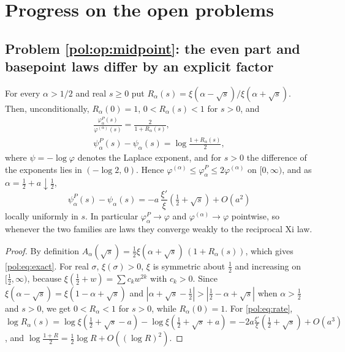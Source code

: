 \section{Progress on the open problems}\label{pol:sec:progress}

\subsection{Problem \ref{pol:op:midpoint}: the even part and basepoint laws differ by an explicit factor}

\begin{theorem}\label{pol:thm:exact}
For every $\alpha>1/2$ and real $s\ge0$ put $R_\alpha(s)=\xi(\alpha-\sqrt s)/\xi(\alpha+\sqrt s)$. Then, unconditionally, $R_\alpha(0)=1$, $0<R_\alpha(s)<1$ for $s>0$, and
\begin{equation}\label{pol:eq:exact}
\begin{gathered}
\frac{\varphi^P_\alpha(s)}{\varphi^{(\alpha)}(s)}=\frac{2}{1+R_\alpha(s)},\\[4pt]
\psi^P_\alpha(s)-\psi_\alpha(s)=\log\frac{1+R_\alpha(s)}{2},
\end{gathered}
\end{equation}
where $\psi=-\log\varphi$ denotes the Laplace exponent, and for $s>0$ the difference of the exponents lies in $\left(-\log2,\,0\right)$. Hence $\varphi^{(\alpha)}\le\varphi^P_\alpha\le2\varphi^{(\alpha)}$ on $[0,\infty)$, and as $\alpha=\frac12+a\downarrow\frac12$,
\begin{equation}\label{pol:eq:rate}
\psi^P_\alpha(s)-\psi_\alpha(s)=-a\,\frac{\xi'}{\xi}\!\left(\tfrac12+\sqrt s\right)+O(a^2)
\end{equation}
locally uniformly in $s$. In particular $\varphi^P_\alpha\to\varphi$ and $\varphi^{(\alpha)}\to\varphi$ pointwise, so whenever the two families are laws they converge weakly to the reciprocal Xi law.
\end{theorem}

\begin{proof}
By definition $A_\alpha(\sqrt s)=\frac12\xi(\alpha+\sqrt s)\,(1+R_\alpha(s))$, which gives \eqref{pol:eq:exact}. For real $\sigma$, $\xi(\sigma)>0$, $\xi$ is symmetric about $\frac12$ and increasing on $[\frac12,\infty)$, because $\xi(\frac12+w)=\sum c_kw^{2k}$ with $c_k>0$. Since $\xi(\alpha-\sqrt s)=\xi(1-\alpha+\sqrt s)$ and $|\alpha+\sqrt s-\frac12|>|\frac12-\alpha+\sqrt s|$ when $\alpha>\frac12$ and $s>0$, we get $0<R_\alpha<1$ for $s>0$, while $R_\alpha(0)=1$. For \eqref{pol:eq:rate}, $\log R_\alpha(s)=\log\xi(\frac12+\sqrt s-a)-\log\xi(\frac12+\sqrt s+a)=-2a\frac{\xi'}{\xi}(\frac12+\sqrt s)+O(a^3)$, and $\log\frac{1+R}{2}=\frac12\log R+O((\log R)^2)$.
\end{proof}

